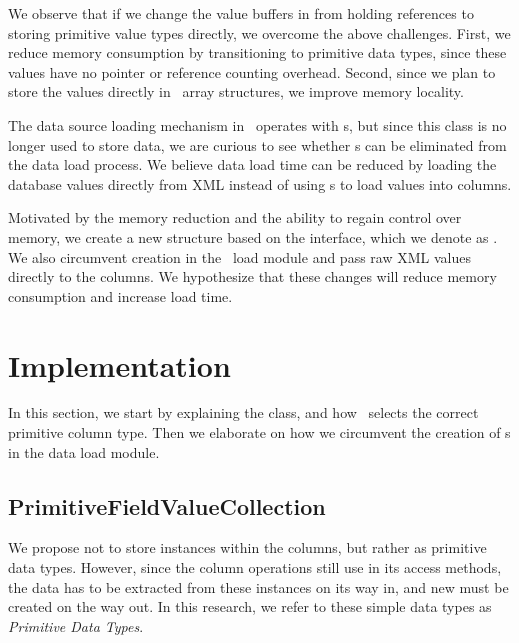 We observe that if we change the value buffers in  from holding  references to storing primitive value types directly, we overcome the above challenges. First, we reduce memory consumption by transitioning to primitive data types, since these values have no pointer or reference counting overhead. Second, since we plan to store the values directly in \delphi~array structures, we improve memory locality.

The data source loading mechanism in \gap~operates with s, but since this class is no longer used to store data, we are curious to see whether s can be eliminated from the data load process. We believe data load time can be reduced by loading the database values directly from XML instead of using s to load values into columns.

Motivated by the memory reduction and the ability to regain control over memory, we create a new structure based on the  interface, which we denote as . We also circumvent  creation in the \gap~load module and pass raw XML values directly to the columns. We hypothesize that these changes will reduce memory consumption and increase load time.
\section{Implementation}
\label{sec:Implementation}
In this section, we start by explaining the  class, and how \gap~selects the correct primitive column type. Then we elaborate on how we circumvent the creation of s in the data load module.

\subsection{PrimitiveFieldValueCollection}
\label{sub:PrimitiveFieldValueCollection}
We propose not to store  instances within the columns, but rather as primitive data types. However, since the column operations still use  in its access methods, the data has to be extracted from these instances on its way in, and new  must be created on the way out. In this research, we refer to these simple data types as \textit{Primitive Data Types}. 


